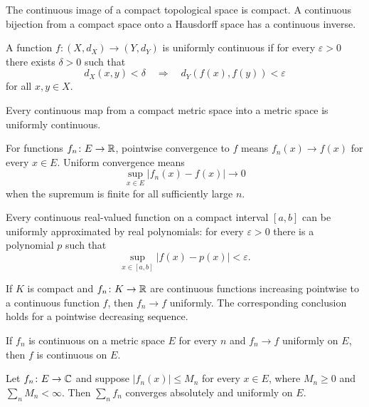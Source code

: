 \begin{theorem}
The continuous image of a compact topological space is compact. A continuous bijection from a compact space onto a Hausdorff space has a continuous inverse.
\end{theorem}

\begin{definition}
A function $f\colon(X,d_X)\to(Y,d_Y)$ is uniformly continuous if for every $\varepsilon>0$ there exists $\delta>0$ such that
\[
 d_X(x,y)<\delta\quad\Longrightarrow\quad d_Y(f(x),f(y))<\varepsilon
\]
for all $x,y\in X$.
\end{definition}

\begin{theorem}
Every continuous map from a compact metric space into a metric space is uniformly continuous.
\end{theorem}


\begin{definition}
For functions $f_n\colon E\to\mathbb{R}$, pointwise convergence to $f$ means $f_n(x)\to f(x)$ for every $x\in E$. Uniform convergence means
\[
 \sup_{x\in E}|f_n(x)-f(x)|\longrightarrow0
\]
when the supremum is finite for all sufficiently large $n$.
\end{definition}

\begin{theorem}
Every continuous real-valued function on a compact interval $[a,b]$ can be uniformly approximated by real polynomials: for every $\varepsilon>0$ there is a polynomial $p$ such that
\[
 \sup_{x\in[a,b]}|f(x)-p(x)|<\varepsilon.
\]
\end{theorem}

\begin{theorem}
If $K$ is compact and $f_n\colon K\to\mathbb{R}$ are continuous functions increasing pointwise to a continuous function $f$, then $f_n\to f$ uniformly. The corresponding conclusion holds for a pointwise decreasing sequence.
\end{theorem}

\begin{theorem}
If $f_n$ is continuous on a metric space $E$ for every $n$ and $f_n\to f$ uniformly on $E$, then $f$ is continuous on $E$.
\end{theorem}

\begin{theorem}
Let $f_n\colon E\to\mathbb{C}$ and suppose $|f_n(x)|\le M_n$ for every $x\in E$, where $M_n\ge0$ and $\sum_n M_n<\infty$. Then $\sum_n f_n$ converges absolutely and uniformly on $E$.
\end{theorem}

